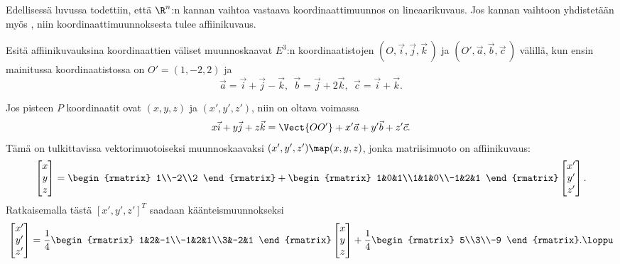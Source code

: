 Edellisessä luvussa todettiin, että $\R^n$:n kannan vaihtoa vastaava koordinaattimuunnos on
lineaarikuvaus. Jos kannan vaihtoon yhdistetään myös
%
, niin koordinaattimuunnoksesta tulee affiinikuvaus.
\begin{Exa} Esitä affiinikuvauksina koordinaattien väliset muunnoskaavat $E^3$:n 
koordinaatistojen $(O,\vec i,\vec j,\vec k\,)$ ja $(O',\vec a,\vec b,\vec c\,)$ välillä, kun
ensin mainitussa koordinaatistossa on $O'=(1,-2,2)$ ja
\[
\vec a=\vec i+\vec j-\vec k,\ \ \vec b=\vec j+2\vec k,\ \ \vec c=\vec i+\vec k.
\]
\end{Exa}
\ratk Jos pisteen $P$ koordinaatit ovat $(x,y,z)$ ja $(x',y',z')$, niin on oltava voimassa
\[
x\vec i+y\vec j+z\vec k=\Vect{OO'}+x'\vec a+y'\vec b+z'\vec c.
\]
Tämä on tulkittavissa vektorimuotoiseksi muunnoskaavaksi $(x',y',z') \map (x,y,z)$, jonka
matriisimuoto on affiinikuvaus:
\[
\begin{bmatrix} x\\y\\z \end{bmatrix} = \begin{rmatrix} 1\\-2\\2 \end{rmatrix} +
\begin{rmatrix} 1&0&1\\1&1&0\\-1&2&1 \end{rmatrix} \begin{bmatrix} x'\\y'\\z' \end{bmatrix}.
\]
Ratkaisemalla tästä $[x',y',z']^T$ saadaan käänteismuunnokseksi
\[
\begin{bmatrix} x'\\y'\\z' \end{bmatrix} = 
\frac{1}{4}\begin{rmatrix} 1&2&-1\\-1&2&1\\3&-2&1 \end{rmatrix} 
           \begin{bmatrix} x\\y\\z \end{bmatrix} +
\frac{1}{4}\begin{rmatrix} 5\\3\\-9 \end{rmatrix}. \loppu
\]

